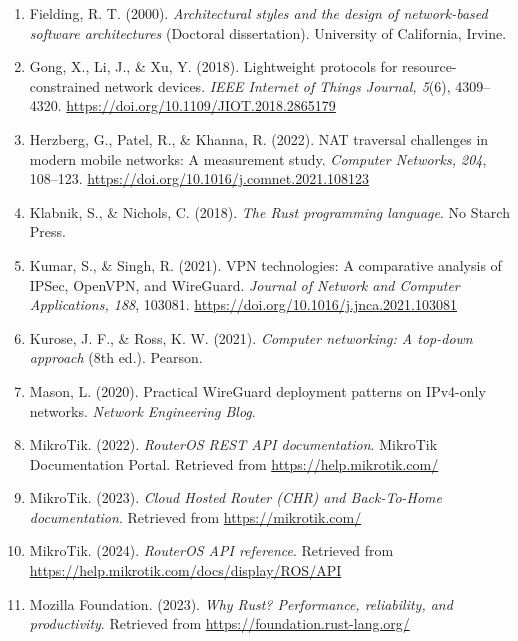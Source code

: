 \documentclass[12pt,a4paper,oneside]{report}
\begin{document}
\begin{enumerate}
\item Fielding, R. T. (2000). \textit{Architectural styles and the design of network-based software architectures} (Doctoral dissertation). University of California, Irvine.

\item Gong, X., Li, J., \& Xu, Y. (2018). Lightweight protocols for resource-constrained network devices. \textit{IEEE Internet of Things Journal, 5}(6), 4309--4320. \url{https://doi.org/10.1109/JIOT.2018.2865179}

\item Herzberg, G., Patel, R., \& Khanna, R. (2022). NAT traversal challenges in modern mobile networks: A measurement study. \textit{Computer Networks, 204}, 108--123. \url{https://doi.org/10.1016/j.comnet.2021.108123}

\item Klabnik, S., \& Nichols, C. (2018). \textit{The Rust programming language}. No Starch Press.

\item Kumar, S., \& Singh, R. (2021). VPN technologies: A comparative analysis of IPSec, OpenVPN, and WireGuard. \textit{Journal of Network and Computer Applications, 188}, 103081. \url{https://doi.org/10.1016/j.jnca.2021.103081}

\item Kurose, J. F., \& Ross, K. W. (2021). \textit{Computer networking: A top-down approach} (8th ed.). Pearson.

\item Mason, L. (2020). Practical WireGuard deployment patterns on IPv4-only networks. \textit{Network Engineering Blog}.

\item MikroTik. (2022). \textit{RouterOS REST API documentation}. MikroTik Documentation Portal. Retrieved from \url{https://help.mikrotik.com/}

\item MikroTik. (2023). \textit{Cloud Hosted Router (CHR) and Back-To-Home documentation}. Retrieved from \url{https://mikrotik.com/}

\item MikroTik. (2024). \textit{RouterOS API reference}. Retrieved from \url{https://help.mikrotik.com/docs/display/ROS/API}

\item Mozilla Foundation. (2023). \textit{Why Rust? Performance, reliability, and productivity}. Retrieved from \url{https://foundation.rust-lang.org/}


\end{enumerate}
\end{document}
